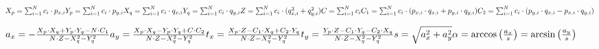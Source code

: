 \documentclass[6pt,a4paper]{scrartcl}
\begin{document}
\begin{multicols}{4}
{$X_p = \sum_{i=1}^N c_i \cdot p_{x,i}\\
  Y_p = \sum_{i=1}^N c_i \cdot p_{y,i} \\
X_q = \sum_{i=1}^N c_i \cdot q_{x,i}\\
  Y_q = \sum_{i=1}^N c_i \cdot q_{y,i} \\
Z = \sum_{i=1}^N c_i \cdot (q_{x,i}^2 + q_{y,i}^2)\\
 C = \sum_{i=1}^N c_i \\
C_1 = \sum_{i=1}^N c_i \cdot (p_{x,i} \cdot q_{x,i} + p_{y,i} \cdot q_{y,i}) \\
 C_2 = \sum_{i=1}^N c_i \cdot (p_{y,i} \cdot q_{x,i} - p_{x,i} \cdot q_{y,i})$

$a_x = - \frac{X_p \cdot X_q + Y_p \cdot Y_q - N \cdot C_1}{N \cdot Z - X_q^2 - Y_q^2} \\
a_y = \frac{X_p \cdot X_q - Y_p \cdot Y_q + C \cdot C_2}{N \cdot Z - X_q^2 - Y_q^2} \\
t_x = \frac{X_p \cdot Z - C_1 \cdot X_q + C_2 \cdot Y_q}{N \cdot Z - X_q^2 - Y_q^2} \\
t_y = \frac{Y_p \cdot Z - C_1 \cdot Y_q - C_2 \cdot X_q}{N \cdot Z - X_q^2 - Y_q^2} \\
s  = \sqrt{a_x^2 + a_y^2} \\
 \alpha = \arccos\left(\frac{a_x}{s}\right) = \arcsin\left(\frac{a_y}{s}\right) $\\

}




\end{multicols}
\end{document}
